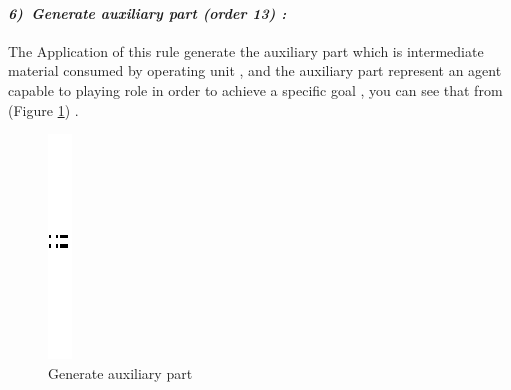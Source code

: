 \paragraph{\emph{6)~Generate auxiliary part  (order 13) :} }

The Application of this rule generate the auxiliary part which is intermediate material consumed by operating unit , and the auxiliary part represent an agent capable to playing role in order to achieve a specific goal , you can see that from (Figure \ref{fig:Generate auxiliary part}) .
\vspace{1cm}
\begin{figure}[th]
\centering 
	\quad{}
		\includegraphics{Chapiter3/img/sep}
	\quad{}
\caption{\label{fig:Generate auxiliary part} Generate auxiliary part}
\end{figure}
\vspace{1cm}




